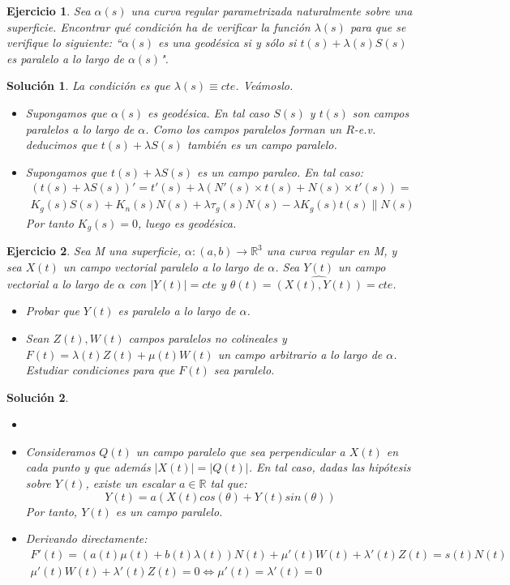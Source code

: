 \documentclass{article}
\theoremstyle{plain}
\newtheorem{exercise}{Ejercicio}
\newtheorem*{sol*}{Solución}
\newcommand{\R}{\mathbb{R}}
\begin{document}
\newpage
\begin{exercise} Sea $\alpha(s)$ una curva regular parametrizada naturalmente sobre una superficie. Encontrar qué condición ha de verificar la función $\lambda(s)$ para que se verifique lo siguiente: ``$\alpha(s)$ es una geodésica si y sólo si $t(s) + \lambda(s)S(s)$ es paralelo a lo largo de $\alpha(s)$".
\end{exercise}
\begin{sol*}
La condición es que $\lambda(s)\equiv cte$. Veámoslo.
\begin{itemize}
\item Supongamos que $\alpha(s)$ es geodésica. En tal caso $S(s)$ y $t(s)$ son campos paralelos a lo largo de $\alpha$. Como los campos paralelos forman un $R$-e.v. deducimos que $t(s)+\lambda S(s)$ también es un campo paralelo.
\item Supongamos que $t(s)+\lambda S(s)$ es un campo paraleo. En tal caso:
\begin{gather*}
(t(s)+\lambda S(s))' = t'(s) + \lambda(N'(s)\times t(s) + N(s)\times t'(s))= \\
K_g(s) S(s) + K_n(s)N(s)+ \lambda \tau_g(s) N(s) - \lambda K_g(s)t(s) \parallel N(s)
\end{gather*}
Por tanto $K_g(s) = 0$, luego es geodésica.
\end{itemize}
\end{sol*}

\newpage
\begin{exercise}
Sea M una superficie, $\alpha:(a,b)\rightarrow \R^3$ una curva regular en M, y sea $X(t)$ un campo vectorial paralelo a lo largo de $\alpha$. Sea $Y(t)$ un campo vectorial a lo largo de $\alpha$ con $|Y(t)|=cte$ y $\theta(t)=\widehat{(X(t),Y(t))} = cte$.
\begin{itemize}
\item Probar que $Y(t)$ es paralelo a lo largo de $\alpha$. 
\item Sean $Z(t),W(t)$ campos paralelos no colineales y $F(t)=\lambda(t) Z(t)+\mu(t) W(t)$ un campo arbitrario a lo largo de $\alpha$. Estudiar condiciones para que $F(t)$ sea paralelo.
\end{itemize} 
\end{exercise}
\begin{sol*}
\begin{itemize}
\item[]
\item Consideramos $Q(t)$ un campo paralelo que sea perpendicular a $X(t)$ en cada punto y que además $|X(t)|=|Q(t)|$. En tal caso, dadas las hipótesis sobre $Y(t)$, existe un escalar $a\in\R$ tal que:
\[
Y(t) = a(X(t)cos(\theta) + Y(t)sin(\theta))
\]
Por tanto, $Y(t)$ es un campo paralelo.
\item Derivando directamente:
\begin{gather*}
F'(t) = (a(t)\mu(t)+b(t)\lambda(t))N(t) + \mu'(t)W(t)+\lambda'(t)Z(t) = s(t)N(t)\\
 \mu'(t)W(t)+\lambda'(t)Z(t) = 0 \Leftrightarrow \mu'(t)=\lambda'(t)=0
\end{gather*}
\end{itemize}
\end{sol*}
\end{document}
